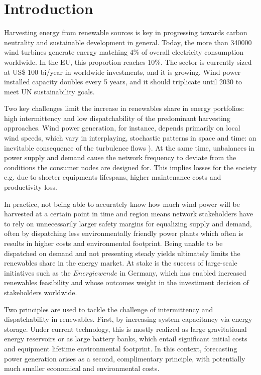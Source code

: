 \chapter{Introduction}
Harvesting energy from renewable sources is key in progressing towards carbon neutrality and sustainable development in general.
Today, the more than 340000 wind turbines generate energy matching 4\% of overall electricity consumption worldwide.
In the EU, this proportion reaches 10\%.
The sector is currently sized at US\$ 100 bi/year in worldwide investments, and it is growing.
Wind power installed capacity doubles every 5 years, and it should triplicate until 2030 to meet UN sustainability goals.

Two key challenges limit the increase in renewables share in energy portfolios: high intermittency and low dispatchability of the predominant harvesting approaches.
Wind power generation, for instance, depends primarily on local wind speeds, which vary in interplaying, stochastic patterns in space and time: an inevitable consequence of the turbulence flows \cite{pope2001turbulent}).
At the same time, unbalances in power supply and demand cause the network frequency to deviate from the conditions the consumer nodes are designed for.
This implies losses for the society e.g. due to shorter equipments lifespans, higher maintenance costs and productivity loss.

In practice, not being able to accurately know how much wind power will be harvested at a certain point in time and region means network stakeholders have to rely on unnecessarily larger safety margins for equalizing supply and demand, often by dispatching less environmentally friendly power plants which often is results in higher costs and environmental footprint.
Being unable to be dispatched on demand and not presenting steady yields ultimately limits the renewables share in the energy market.
At stake is the success of large-scale initiatives such as the $\textit{Energiewende}$ in Germany, which has enabled increased renewables feasibility and whose outcomes weight in the investiment decision of stakeholders worldwide.

Two principles are used to tackle the challenge of intermittency and dispatchability in renewables.
First, by increasing system capacitancy via energy storage.
Under current technology, this is mostly realized as large gravitational energy reservoirs or as large battery banks, which entail significant initial costs and equipment lifetime environmental footprint.
In this context, forecasting power generation arises as a second, complimentary principle, with potentially much smaller economical and environmental costs.

